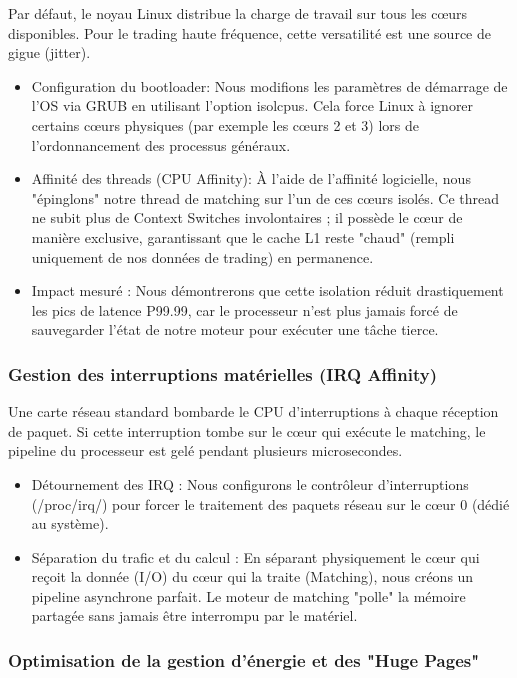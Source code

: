 Par défaut, le noyau Linux distribue la charge de travail sur tous les cœurs disponibles. Pour le trading haute fréquence, cette versatilité est une source de gigue (jitter).

\begin{itemize}
    \item Configuration du bootloader: Nous modifions les paramètres de démarrage de l'OS via GRUB en utilisant l'option isolcpus. Cela force Linux à ignorer certains cœurs physiques (par exemple les cœurs 2 et 3) lors de l'ordonnancement des processus généraux.
    \item Affinité des threads (CPU Affinity): À l'aide de l'affinité logicielle, nous "épinglons" notre thread de matching sur l'un de ces cœurs isolés. Ce thread ne subit plus de Context Switches involontaires ; il possède le cœur de manière exclusive, garantissant que le cache L1 reste "chaud" (rempli uniquement de nos données de trading) en permanence.
    \item Impact mesuré : Nous démontrerons que cette isolation réduit drastiquement les pics de latence P99.99, car le processeur n'est plus jamais forcé de sauvegarder l'état de notre moteur pour exécuter une tâche tierce.
\end{itemize}

\subsubsection{Gestion des interruptions matérielles (IRQ Affinity)}

Une carte réseau standard bombarde le CPU d'interruptions à chaque réception de paquet. Si cette interruption tombe sur le cœur qui exécute le matching, le pipeline du processeur est gelé pendant plusieurs microsecondes.

\begin{itemize}
    \item Détournement des IRQ : Nous configurons le contrôleur d'interruptions (/proc/irq/) pour forcer le traitement des paquets réseau sur le cœur 0 (dédié au système).
    \item Séparation du trafic et du calcul : En séparant physiquement le cœur qui reçoit la donnée (I/O) du cœur qui la traite (Matching), nous créons un pipeline asynchrone parfait. Le moteur de matching "polle" la mémoire partagée sans jamais être interrompu par le matériel.
\end{itemize}

\subsubsection{Optimisation de la gestion d'énergie et des "Huge Pages"}

